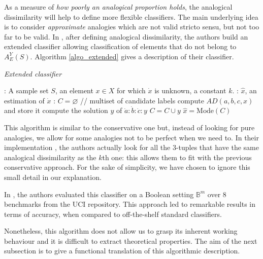 {As a measure of \textit{how poorly an analogical proportion holds}, the
analogical dissimilarity will help to define more flexible classifiers.  The
main underlying idea is to consider {\it approximate} analogies which are not
valid stricto sensu, but not too far to be valid.
In \cite{BayMicDelIJCAI07}, after defining analogical dissimilarity,  the authors
build an extended classifier allowing classification of elements that do not
belong to $A_E^Y(S)$.  Algorithm \ref{algo_extended} gives a description of
their classifier.
\begin{algorithm}[!ht]
 \caption{\textit{Extended classifier}}
       \label{algo_extended}
       \begin{algorithmic}

      : A sample set $S$, an element $x \in X$ for which
      $\dot{x}$ is unknown, a constant $k$.
      : $\hat{x}$, an estimation of $\dot{x}$
      : $C = \varnothing$ \quad \quad // multiset of candidate labels
        \STATE compute $AD(a, b, c, x)$ and store it
	    \ENDFOR
      \STATE compute the solution $y$ of $\dot{a} : \dot{b} : \dot{c} : y$
      \STATE $C = C \cup y$
    \ENDFOR
    \STATE $\hat{x} = \text{Mode}(C)$
\end{algorithmic}
\end{algorithm}

This algorithm is similar to the conservative one but, instead of looking for
pure analogies, we allow for some analogies not to be perfect when we need to.
In their implementation \cite{BayMicDelIJCAI07}, the authors actually look for
all the 3-tuples that have the same analogical dissimilarity as the $k$th one:
this allows them to fit with the previous conservative approach. For the sake of
simplicity, we have chosen to
ignore this small detail in our explanation.

In \cite{BayMicDelIJCAI07}, the authors evaluated this classifier on a Boolean setting
$\mathbb{B}^m$ over 8 benchmarks from the UCI repository.  This approach led to
remarkable results in terms of accuracy, when compared to off-the-shelf
standard classifiers.

Nonetheless, this algorithm does not allow us to grasp its inherent working
behaviour and it is difficult to extract theoretical properties. The aim of the
next subsection is to give a functional translation of this algorithmic
description.

}
